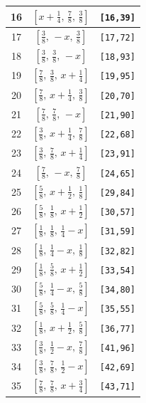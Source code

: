 \documentclass[fleqn,8pt]{jsarticle}
\begin{document}
\begin{longtable}{ccc}
16 & $\left[ x + \frac{1}{4},\, \frac{7}{8},\, \frac{3}{8} \right]$ & {\tt [16,39]} \\ \hline
17 & $\left[ \frac{3}{8},\, - x,\, \frac{3}{8} \right]$ & {\tt [17,72]} \\ \hline
18 & $\left[ \frac{3}{8},\, \frac{3}{8},\, - x \right]$ & {\tt [18,93]} \\ \hline
19 & $\left[ \frac{7}{8},\, \frac{3}{8},\, x + \frac{1}{4} \right]$ & {\tt [19,95]} \\ \hline
20 & $\left[ \frac{7}{8},\, x + \frac{1}{4},\, \frac{3}{8} \right]$ & {\tt [20,70]} \\ \hline
21 & $\left[ \frac{7}{8},\, \frac{7}{8},\, - x \right]$ & {\tt [21,90]} \\ \hline
22 & $\left[ \frac{3}{8},\, x + \frac{1}{4},\, \frac{7}{8} \right]$ & {\tt [22,68]} \\ \hline
23 & $\left[ \frac{3}{8},\, \frac{7}{8},\, x + \frac{1}{4} \right]$ & {\tt [23,91]} \\ \hline
24 & $\left[ \frac{7}{8},\, - x,\, \frac{7}{8} \right]$ & {\tt [24,65]} \\ \hline
25 & $\left[ \frac{5}{8},\, x + \frac{1}{2},\, \frac{1}{8} \right]$ & {\tt [29,84]} \\ \hline
26 & $\left[ \frac{5}{8},\, \frac{1}{8},\, x + \frac{1}{2} \right]$ & {\tt [30,57]} \\ \hline
27 & $\left[ \frac{1}{8},\, \frac{1}{8},\, \frac{1}{4} - x \right]$ & {\tt [31,59]} \\ \hline
28 & $\left[ \frac{1}{8},\, \frac{1}{4} - x,\, \frac{1}{8} \right]$ & {\tt [32,82]} \\ \hline
29 & $\left[ \frac{1}{8},\, \frac{5}{8},\, x + \frac{1}{2} \right]$ & {\tt [33,54]} \\ \hline
30 & $\left[ \frac{5}{8},\, \frac{1}{4} - x,\, \frac{5}{8} \right]$ & {\tt [34,80]} \\ \hline
31 & $\left[ \frac{5}{8},\, \frac{5}{8},\, \frac{1}{4} - x \right]$ & {\tt [35,55]} \\ \hline
32 & $\left[ \frac{1}{8},\, x + \frac{1}{2},\, \frac{5}{8} \right]$ & {\tt [36,77]} \\ \hline
33 & $\left[ \frac{3}{8},\, \frac{1}{2} - x,\, \frac{7}{8} \right]$ & {\tt [41,96]} \\ \hline
34 & $\left[ \frac{3}{8},\, \frac{7}{8},\, \frac{1}{2} - x \right]$ & {\tt [42,69]} \\ \hline
35 & $\left[ \frac{7}{8},\, \frac{7}{8},\, x + \frac{3}{4} \right]$ & {\tt [43,71]} \\ \hline

\end{longtable}
\end{document}
